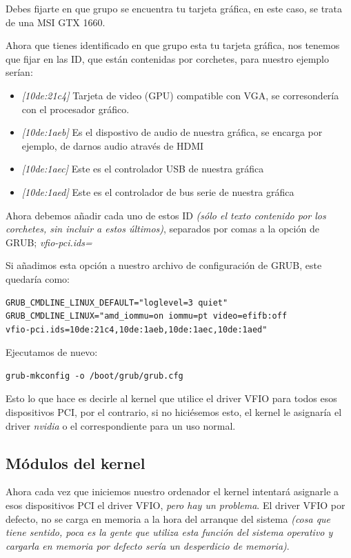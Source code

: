 \documentclass[12pt]{article}
\begin{document}
Debes fijarte en que grupo se encuentra tu tarjeta gráfica, en este caso, se trata de una MSI GTX 1660.

Ahora que tienes identificado en que grupo esta tu tarjeta gráfica, nos tenemos que fijar en las ID, que están contenidas por corchetes, para nuestro ejemplo serían:

\begin{itemize}
	\setlength\itemsep{-0.2em}
	\item \emph{[10de:21c4]} Tarjeta de video (GPU) compatible con VGA, se corresondería con el procesador gráfico.
	\item \emph{[10de:1aeb]} Es el dispostivo de audio de nuestra gráfica, se encarga por ejemplo, de darnos audio através de HDMI
	\item \emph{[10de:1aec]} Este es el controlador USB de nuestra gráfica
	\item \emph{[10de:1aed]} Este es el controlador de bus serie de nuestra gráfica
\end{itemize}

Ahora debemos añadir cada uno de estos ID \emph{(sólo el texto contenido por los corchetes, sin incluir a estos últimos)}, separados por comas a la opción de GRUB; \emph{vfio-pci.ids=}

Si añadimos esta opción a nuestro archivo de configuración de GRUB, este quedaría como:

\begin{lstlisting}[basicstyle=\ttfamily]
GRUB_CMDLINE_LINUX_DEFAULT="loglevel=3 quiet"
GRUB_CMDLINE_LINUX="amd_iommu=on iommu=pt video=efifb:off
vfio-pci.ids=10de:21c4,10de:1aeb,10de:1aec,10de:1aed"
\end{lstlisting}

Ejecutamos de nuevo:

\begin{verbatim}
grub-mkconfig -o /boot/grub/grub.cfg
\end{verbatim}

Esto lo que hace es decirle al kernel que utilice el driver VFIO para todos esos dispositivos PCI, por el contrario, si no hiciésemos esto, el kernel le asignaría el driver \emph{nvidia} o el correspondiente para un uso normal.

\subsection{Módulos del kernel}

Ahora cada vez que iniciemos nuestro ordenador el kernel intentará asignarle a esos dispositivos PCI el driver VFIO, \emph{pero hay un problema}. El driver VFIO por defecto, no se carga en memoria a la hora del arranque del sistema \emph{(cosa que tiene sentido, poca es la gente que utiliza esta función del sistema operativo y cargarla en memoria por defecto sería un desperdicio de memoria)}.
\end{document}
